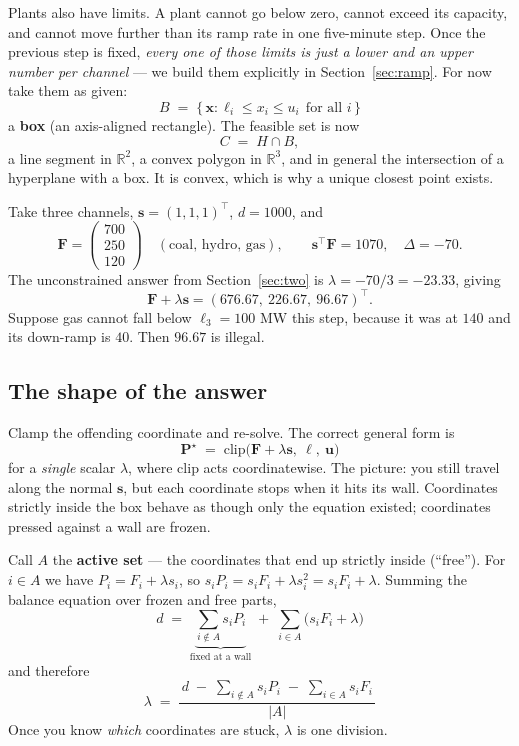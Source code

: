 \documentclass[11pt]{article}
\newcommand{\s}{\mathbf{s}}
\newcommand{\F}{\mathbf{F}}
\newcommand{\Pv}{\mathbf{P}}
\newcommand{\lo}{\bm{\ell}}
\newcommand{\hi}{\mathbf{u}}
\newcommand{\R}{\mathbb{R}}
\begin{document}
Plants also have limits. A plant cannot go below zero, cannot exceed its
capacity, and cannot move further than its ramp rate in one five-minute step.
Once the previous step is fixed, \emph{every one of those limits is just a lower
and an upper number per channel} --- we build them explicitly in
Section~\ref{sec:ramp}. For now take them as given:
\[
  B \;=\; \{\,\mathbf{x} : \ell_i \le x_i \le u_i \ \ \text{for all } i \,\}
\]
a \textbf{box} (an axis-aligned rectangle). The feasible set is now
\[
  C \;=\; H \cap B,
\]
a line segment in $\R^2$, a convex polygon in $\R^3$, and in general the
intersection of a hyperplane with a box. It is convex, which is why a unique
closest point exists.

Take three channels, $\s = (1,1,1)^{\!\top}$, $d = 1000$, and
\[
  \F = \begin{pmatrix}700\\250\\120\end{pmatrix}
  \quad(\text{coal, hydro, gas}), \qquad \s^{\!\top}\F = 1070,\quad \Delta = -70 .
\]
The unconstrained answer from Section~\ref{sec:two} is $\lambda = -70/3 =
-23.33$, giving
\[
  \F + \lambda\s = (676.67,\ 226.67,\ 96.67)^{\!\top}.
\]
Suppose gas cannot fall below $\ell_3 = 100$ MW this step, because it was at
$140$ and its down-ramp is $40$. Then $96.67$ is illegal.

\subsection*{The shape of the answer}

Clamp the offending coordinate and re-solve. The correct general form is
\[
  \boxed{\;\Pv^\star \;=\; \mathrm{clip}\bigl(\F + \lambda\s,\ \lo,\ \hi\bigr)\;}
\]
for a \emph{single} scalar $\lambda$, where $\mathrm{clip}$ acts coordinatewise.
The picture: you still travel along the normal $\s$, but each coordinate stops
when it hits its wall. Coordinates strictly inside the box behave as though only
the equation existed; coordinates pressed against a wall are frozen.

Call $A$ the \textbf{active set} --- the coordinates that end up strictly inside
(``free''). For $i \in A$ we have $P_i = F_i + \lambda s_i$, so
$s_i P_i = s_i F_i + \lambda s_i^2 = s_i F_i + \lambda$. Summing the balance
equation over frozen and free parts,
\[
  d \;=\; \underbrace{\sum_{i \notin A} s_i P_i}_{\text{fixed at a wall}}
        \;+\; \sum_{i \in A}\bigl(s_i F_i + \lambda\bigr)
\]
and therefore
\begin{equation}
\boxed{\;
  \lambda \;=\;
  \frac{\,d \;-\; \sum_{i \notin A} s_i P_i \;-\; \sum_{i \in A} s_i F_i\,}{\lvert A\rvert}\;}
\label{eq:lambda}
\end{equation}
Once you know \emph{which} coordinates are stuck, $\lambda$ is one division.
\end{document}
